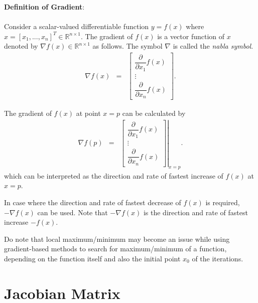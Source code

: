 \begin{mdframed}
	\textbf{Definition of Gradient}:
	\\
	\\
Consider a scalar-valued differentiable function $y=f(x)$ where $x = [x_1,...,x_n]^T \in \mathbb{R}^{n \times 1}$. The gradient of $f(x)$ is a vector function of $x$ denoted by $\nabla f(x) \in \mathbb{R}^{n \times 1}$ as follows. The symbol $\nabla$ is called the \textit{nabla symbol}.
\begin{eqnarray}
  \nabla f(x) &=& \left[\begin{array}{c}
                          \dfrac{\partial}{\partial x_1}f(x) \\
                          \vdots \\
                          \dfrac{\partial}{\partial x_n}f(x)
                        \end{array}\right]. \nonumber
\end{eqnarray}

The gradient of $f(x)$ at point $x=p$ can be calculated by
\begin{eqnarray}
  \nabla f(p) &=& \left.\left[\begin{array}{c}
                         \dfrac{\partial}{\partial x_1}f(x) \\
                          \vdots \\
                          \dfrac{\partial}{\partial x_n}f(x)
                        \end{array}\right]\right|_{x = p}. \nonumber
\end{eqnarray}
which can be interpreted as the direction and rate of fastest increase of $f(x)$ at $x=p$.
	
\end{mdframed}

In case where the direction and rate of fastest decrease of $f(x)$ is required, $-\nabla f(x)$ can be used. Note that $-\nabla f(x)$ is the direction and rate of fastest increase $-f(x)$.

Do note that local maximum/minimum may become an issue while using gradient-based methods to search for maximum/minimum of a function, depending on the function itself and also the initial point $x_0$ of the iterations.

\section{Jacobian Matrix} \label{ch6sec:jacobianmatrix}

